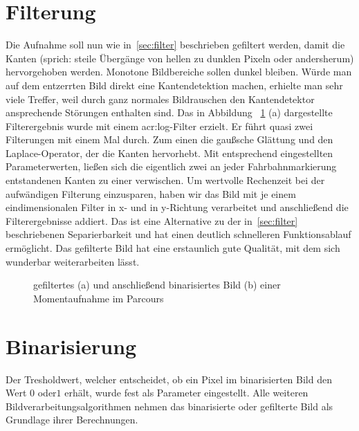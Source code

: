 \section{Filterung}
\label{sec:bildvorverarbeitung:filterung}
Die Aufnahme soll nun wie in~\ref{sec:filter} beschrieben gefiltert werden, damit die Kanten (sprich: steile Übergänge von hellen zu dunklen Pixeln oder andersherum) hervorgehoben werden. Monotone Bildbereiche sollen dunkel bleiben. Würde man auf dem entzerrten Bild direkt eine Kantendetektion machen, erhielte man sehr viele Treffer, weil durch ganz normales Bildrauschen den Kantendetektor ansprechende Störungen enthalten sind. Das in Abbildung ~\ref{fig:bildvorverarbeitung_filtern} (a) dargestellte Filterergebnis wurde mit einem \gls{acr:log}-Filter erzielt. Er führt quasi zwei Filterungen mit einem Mal durch. Zum einen die gaußsche Glättung und den Laplace-Operator, der die Kanten hervorhebt. Mit entsprechend eingestellten Parameterwerten, ließen sich die eigentlich zwei an jeder Fahrbahnmarkierung entstandenen Kanten zu einer verwischen. Um wertvolle Rechenzeit bei der aufwändigen Filterung einzusparen, haben wir das Bild mit je einem eindimensionalen Filter in x- und in y-Richtung verarbeitet und anschließend die Filterergebnisse addiert. Das ist eine Alternative zu der in~\ref{sec:filter} beschriebenen Separierbarkeit und hat einen deutlich schnelleren Funktionsablauf ermöglicht. Das gefilterte Bild hat eine erstaunlich gute Qualität, mit dem sich wunderbar weiterarbeiten lässt.


\begin{figure}[hb] %
  \centering
  \qquad
  \caption{gefiltertes (a) und anschließend binarisiertes Bild (b) einer Momentaufnahme im Parcours}
\label{fig:bildvorverarbeitung_filtern}
\end{figure} 

\section{Binarisierung}

Der Tresholdwert, welcher entscheidet, ob ein Pixel im binarisierten Bild den Wert \glqq \(0\)\grqq{} oder\glqq \(1\)\grqq{} erhält, wurde fest als Parameter eingestellt. Alle weiteren Bildverarbeitungsalgorithmen nehmen das binarisierte oder gefilterte Bild als Grundlage ihrer Berechnungen.
